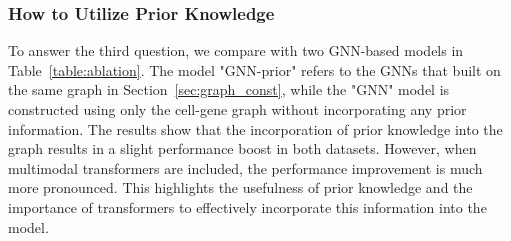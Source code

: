 \subsubsection{How to Utilize Prior Knowledge} To answer the third question, we compare \method{} with two GNN-based models in Table~\ref{table:ablation}. The model "GNN-prior" refers to the GNNs that built on the same graph in Section~\ref{sec:graph_const}, while the "GNN" model is constructed using only the cell-gene graph without incorporating any prior information. The results show that the incorporation of prior knowledge into the graph results in a slight performance boost in both datasets. However, when multimodal transformers are included, the performance improvement is much more pronounced. This highlights the usefulness of prior knowledge and the importance of transformers to effectively incorporate this information into the model.









